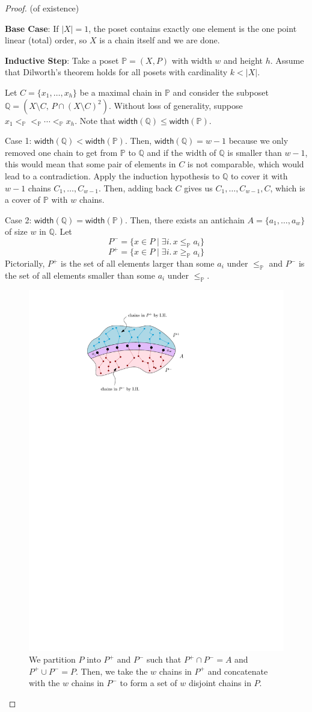 \begin{proof} (of existence)
    \hfill

    \textbf{Base Case}: If $|X| = 1$, the poset contains exactly one element is the one point linear (total) order, so $X$ is a chain itself and we are done.

    \textbf{Inductive Step}: Take a poset $\mathbb{P} = (X,P)$ with width $w$ and height $h$. Assume that Dilworth's theorem holds for all posets with cardinality $k < |X|$.

    Let $C = \{x_1,\ldots,x_h\}$ be a maximal chain in $\mathbb{P}$ and consider the subposet $\mathbb{Q} = (X \setminus C,\, P \cap (X \setminus C)^2)$. Without loss of generality, suppose $x_1 <_{\mathbb{P}} <_{\mathbb{P}} \cdots <_{\mathbb{P}} x_h$. Note that $\mathsf{width}(\mathbb{Q}) \leq \mathsf{width}(\mathbb{P})$.

    Case 1: $\mathsf{width}(\mathbb{Q}) < \mathsf{width}(\mathbb{P})$. Then, $\mathsf{width}(\mathbb{Q}) = w-1$ because we only removed one chain to get from $\mathbb{P}$ to $\mathbb{Q}$ and if the width of $\mathbb{Q}$ is smaller than $w-1$, this would mean that some pair of elements in $C$ is not comparable, which would lead to a contradiction. Apply the induction hypothesis to $\mathbb{Q}$ to cover it with $w-1$ chains $C_1, \ldots, C_{w-1}$. Then, adding back $C$ gives us $C_1,\ldots,C_{w-1},C$, which is a cover of $\mathbb{P}$ with $w$ chains.

    Case 2: $\mathsf{width}(\mathbb{Q}) = \mathsf{width}(\mathbb{P})$. Then, there exists an antichain $A = \{a_1,\ldots,a_w\}$ of size $w$ in $\mathbb{Q}$. Let
    $$
    P^- = \{ x \in P \mid \exists i.\,x \leq_{\mathbb{P}} a_i \}
    $$
    $$
    P^+ = \{ x \in P \mid \exists i.\, x \geq_{\mathbb{P}} a_i \}
    $$
    Pictorially, $P^+$ is the set of all elements larger than some $a_i$ under $\leq_{\mathbb{P}}$ and $P^-$ is the set of all elements smaller than some $a_i$ under $\leq_{\mathbb{P}}$.

    \begin{figure}[htbp]
        \centering
        \includegraphics[width=0.4\linewidth]{figures/dilworth-proof-partition.pdf}
        \caption{We partition $P$ into $P^+$ and $P^-$ such that $P^+ \cap P^- = A$ and $P^+ \cup P^- = P$. Then, we take the $w$ chains in $P^+$ and concatenate with the $w$ chains in $P^-$ to form a set of $w$ disjoint chains in $P$.}
        \label{fig:dilworth-proof-partition}
    \end{figure}


\end{proof}
